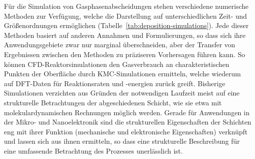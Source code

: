 
Für die Simulation von Gasphasenabscheidungen stehen verschiedene numerische Methoden zur Verfügung, welche die Darstellung auf unterschiedlichen Zeit- und Größenordnungen ermöglichen (Tabelle~\ref{tab:deposition-simulations}).
Jede dieser Methoden basiert auf anderen Annahmen und Formulierungen, so dass sich ihre Anwendungsgebiete zwar nur marginal überschneiden, aber der Transfer von Ergebnissen zwischen den Methoden zu präziseren Vorhersagen führen kann.
So können CFD-Reaktorsimulationen den Gasverbrauch an charakteristischen Punkten der Oberfläche durch KMC-Simulationen ermitteln, welche wiederum auf DFT-Daten für Reaktionsraten und -energien zurück greift.
Bisherige Simulationen verzichten aus Gründen der notwendigen Laufzeit meist auf eine strukturelle Betrachtungen der abgeschiedenen Schicht, wie sie etwa mit molekulardynamischen Rechnungen möglich werden.
Gerade für Anwendungen in der Mikro- und Nanoelektronik sind die strukturellen Eigenschaften der Schichten eng mit ihrer Funktion (mechanische und elektronische Eigenschaften) verknüpft und lassen sich aus ihnen ermitteln, so dass eine strukturelle Beschreibung für eine umfassende Betrachtung des Prozesses unerlässlich ist.
